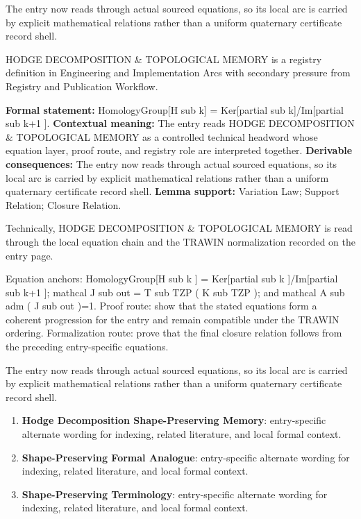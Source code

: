 The entry now reads through actual sourced equations, so its local arc is carried by explicit mathematical relations rather than a uniform quaternary certificate record shell.
\clearpage


\begingroup\small
{}
HODGE DECOMPOSITION \& TOPOLOGICAL MEMORY is a registry definition in Engineering and Implementation Arcs with secondary pressure from Registry and Publication Workflow.

\begingroup\footnotesize\setlength{\emergencystretch}{3em}\sloppy
\textbf{Formal statement:} HomologyGroup[H sub k] = Ker[partial sub k]/Im[partial sub k+1 ]. \textbf{Contextual meaning:} The entry reads HODGE DECOMPOSITION \& TOPOLOGICAL MEMORY as a controlled technical headword whose equation layer, proof route, and registry role are interpreted together. \textbf{Derivable consequences:} The entry now reads through actual sourced equations, so its local arc is carried by explicit mathematical relations rather than a uniform quaternary certificate record shell. \textbf{Lemma support:} Variation Law; Support Relation; Closure Relation.\par
\endgroup

Technically, HODGE DECOMPOSITION \& TOPOLOGICAL MEMORY is read through the local equation chain and the TRAWIN normalization recorded on the entry page.

Equation anchors: HomologyGroup[H sub k ] = Ker[partial sub k ]/Im[partial sub k+1 ]; mathcal J sub out = T sub TZP ( K sub TZP ); and mathcal A sub adm ( J sub out )=1. Proof route: show that the stated equations form a coherent progression for the entry and remain compatible under the TRAWIN ordering. Formalization route: prove that the final closure relation follows from the preceding entry-specific equations.

The entry now reads through actual sourced equations, so its local arc is carried by explicit mathematical relations rather than a uniform quaternary certificate record shell.
\endgroup

\begin{enumerate}[leftmargin=1.6em,itemsep=6pt,topsep=4pt]
\item \textbf{Hodge Decomposition Shape-Preserving Memory}: entry-specific alternate wording for indexing, related literature, and local formal context.
\item \textbf{Shape-Preserving Formal Analogue}: entry-specific alternate wording for indexing, related literature, and local formal context.
\item \textbf{Shape-Preserving Terminology}: entry-specific alternate wording for indexing, related literature, and local formal context.
\end{enumerate}

